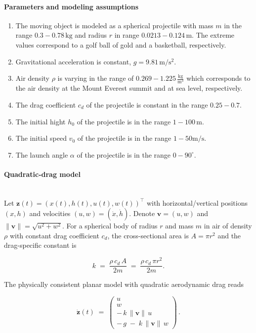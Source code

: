 \paragraph{Parameters and modeling assumptions}
\begin{enumerate}
    \item The moving object is modeled as a spherical projectile with mass $m$
    in the range $0.3 - 0.78\,\mathrm{kg}$ and radius $r$ in range $0.0213 -
    0.124 \,\mathrm{m}$. The extreme values correspond to a golf ball of gold
    and a basketball, respectively.
    \item Gravitational acceleration is constant, $g=9.81\,\mathrm{m/s^2}$.
    \item Air density $\rho$ is varying in the range of $0.269 -
    1.225\,\frac{\mathrm{kg}}{\mathrm{m}^3}$ which corresponds to the air
    density at the Mount Everest summit and at sea level, respectively.
    \item The drag coefficient $c_d$ of the projectile is constant in the range
    $0.25 - 0.7$.
    \item The initial hight $h_0$ of the projectile is in the range $1 -
    100\,\mathrm{m}$.
    \item The initial speed $v_0$ of the projectile is in the range $1-50
    \mathrm{m/s}$.
    \item The launch angle $\alpha$ of the projectile is in the range $0 -
    90^\circ$.
\end{enumerate}

\paragraph{Quadratic-drag model}\ \\
Let $\mathbf{z}(t) = (x(t),h(t),u(t),w(t))^\top$ with horizontal/vertical
positions $(x,h)$ and velocities $(u,w)=(\dot x,\dot h)$. Denote $\mathbf
v=(u,w)$ and $\|\mathbf v\|=\sqrt{u^2+w^2}$. For a spherical body of radius $r$
and mass $m$ in air of density $\rho$ with constant drag coefficient $c_d$, the
cross-sectional area is $A=\pi r^2$ and the drag-specific constant is

\begin{equation*}
k \;=\; \frac{\rho\,c_d\,A}{2m}\;=\;\frac{\rho\,c_d\,\pi r^2}{2m}.
\end{equation*}

The physically consistent planar model with quadratic aerodynamic drag reads

\begin{equation}
\label{eq:proj_ode_vector}
\dot{\mathbf z}(t)
\;=\;
\begin{pmatrix}
u\\
w\\
-\,k\,\|\mathbf v\|\,u\\
-\,g \;-\; k\,\|\mathbf v\|\,w
\end{pmatrix}\,.
\end{equation}

